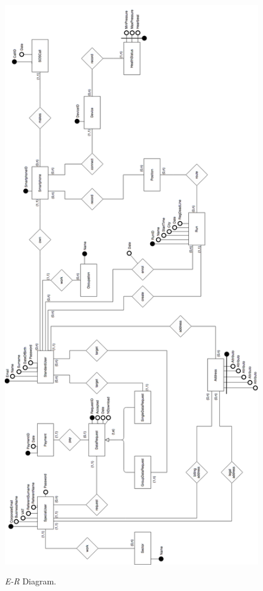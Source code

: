 \begin{figure}[H]
  \begin{center}
  	\includegraphics[width=\textwidth,height=0.58\paperheight,keepaspectratio]{./img/ER.png}
		\caption{\textit{E-R} Diagram.}
    \hspace{0.05\linewidth}
    \centering
		\label{img:ER Diagram}
    \end{center}
\end{figure}

